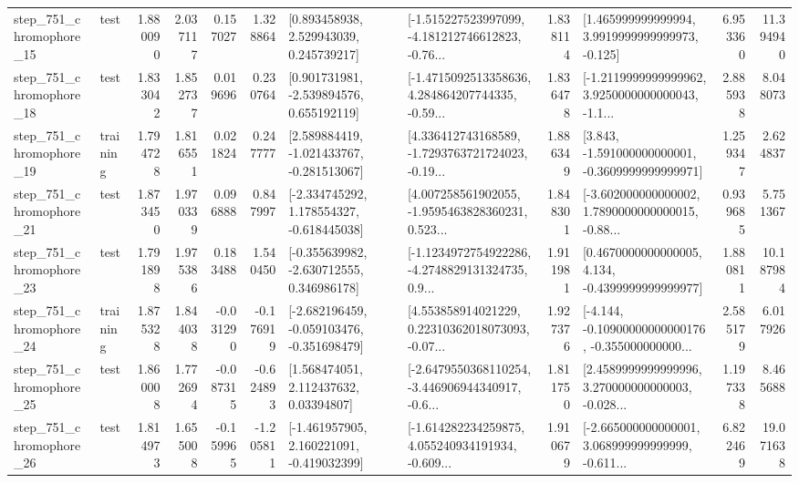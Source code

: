 \begin{tabular}{llrrrrllrlrr}
  step\_751\_chromophore\_15 &      test &      1.880090 &    2.037117 &      0.157027 &  1.328864 &     [0.893458938, 2.529943039, 0.245739217] &  [-1.515227523997099, -4.181212746612823, -0.76... &       1.838114 &    [1.465999999999994, 3.9919999999999973, -0.125] &            6.953360 &         11.394940 \\
  step\_751\_chromophore\_18 &      test &      1.833042 &    1.852737 &      0.019696 &  0.230764 &    [0.901731981, -2.539894576, 0.655192119] &  [-1.4715092513358636, 4.284864207744335, -0.59... &       1.836478 &  [-1.2119999999999962, 3.9250000000000043, -1.1... &            2.885938 &          8.048073 \\
  step\_751\_chromophore\_19 &  training &      1.794728 &    1.816551 &      0.021824 &  0.247777 &   [2.589884419, -1.021433767, -0.281513067] &  [4.336412743168589, -1.7293763721724023, -0.19... &       1.886349 &   [3.843, -1.591000000000001, -0.3609999999999971] &            1.259347 &          2.624837 \\
  step\_751\_chromophore\_21 &      test &      1.873450 &    1.970339 &      0.096888 &  0.847997 &   [-2.334745292, 1.178554327, -0.618445038] &  [4.007258561902055, -1.9595463828360231, 0.523... &       1.848301 &  [-3.602000000000002, 1.7890000000000015, -0.88... &            0.939685 &          5.751367 \\
  step\_751\_chromophore\_23 &      test &      1.791898 &    1.975386 &      0.183488 &  1.540450 &   [-0.355639982, -2.630712555, 0.346986178] &  [-1.1234972754922286, -4.2748829131324735, 0.9... &       1.911981 &   [0.4670000000000005, 4.134, -0.4399999999999977] &            1.880811 &         10.187984 \\
  step\_751\_chromophore\_24 &  training &      1.875328 &    1.844038 &     -0.031290 & -0.176919 &  [-2.682196459, -0.059103476, -0.351698479] &  [4.553858914021229, 0.22310362018073093, -0.07... &       1.927376 &  [-4.144, -0.10900000000000176, -0.355000000000... &            2.585179 &          6.017926 \\
  step\_751\_chromophore\_25 &      test &      1.860008 &    1.772694 &     -0.087315 & -0.624893 &      [1.568474051, 2.112437632, 0.03394807] &  [-2.6479550368110254, -3.446906944340917, -0.6... &       1.811750 &  [2.4589999999999996, 3.270000000000003, -0.028... &            1.197338 &          8.465688 \\
  step\_751\_chromophore\_26 &      test &      1.814973 &    1.655008 &     -0.159965 & -1.205811 &   [-1.461957905, 2.160221091, -0.419032399] &  [-1.614282234259875, 4.055240934191934, -0.609... &       1.910679 &  [-2.665000000000001, 3.068999999999999, -0.611... &            6.822469 &         19.071638 \\

\end{tabular}

